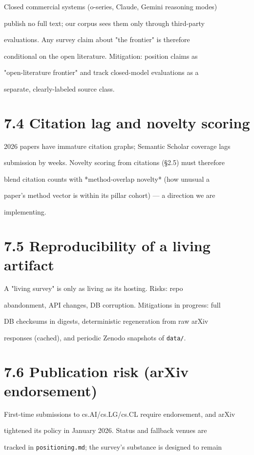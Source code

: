 \documentclass[11pt]{article}
\begin{document}
Closed commercial systems (o-series, Claude, Gemini reasoning modes)

publish no full text; our corpus sees them only through third-party

evaluations. Any survey claim about "the frontier" is therefore

conditional on the open literature. Mitigation: position claims as

"open-literature frontier" and track closed-model evaluations as a

separate, clearly-labeled source class.


\section{7.4 Citation lag and novelty scoring}

2026 papers have immature citation graphs; Semantic Scholar coverage lags

submission by weeks. Novelty scoring from citations (\S2.5) must therefore

blend citation counts with *method-overlap novelty* (how unusual a

paper's method vector is within its pillar cohort) --- a direction we are

implementing.


\section{7.5 Reproducibility of a living artifact}

A "living survey" is only as living as its hosting. Risks: repo

abandonment, API changes, DB corruption. Mitigations in progress: full

DB checksums in digests, deterministic regeneration from raw arXiv

responses (cached), and periodic Zenodo snapshots of \texttt{data/}.


\section{7.6 Publication risk (arXiv endorsement)}

First-time submissions to cs.AI/cs.LG/cs.CL require endorsement, and arXiv

tightened its policy in January 2026. Status and fallback venues are

tracked in \texttt{positioning.md}; the survey's substance is designed to remain
\end{document}

